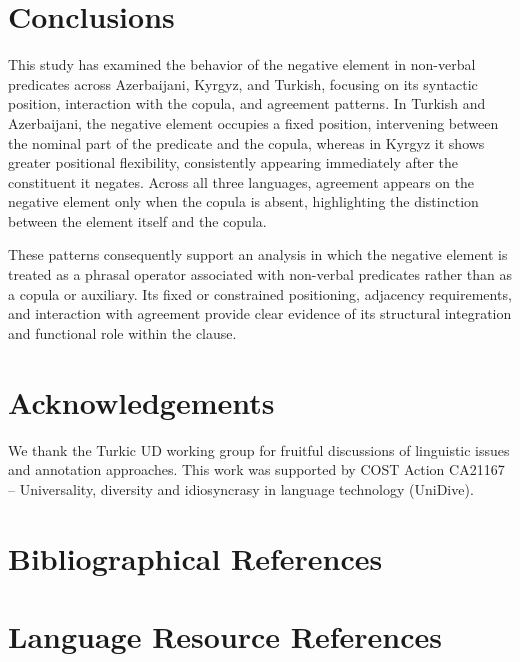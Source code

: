 \documentclass[10pt, a4paper]{article}
\begin{document}
\section{Conclusions}

This study has examined the behavior of the negative element in non-verbal predicates across Azerbaijani, Kyrgyz, and Turkish, focusing on its syntactic position, interaction with the copula, and agreement patterns.
In Turkish and Azerbaijani, the negative element occupies a fixed position, intervening between the nominal part of the predicate and the copula, whereas in Kyrgyz it shows greater positional flexibility, consistently appearing immediately after the constituent it negates.
Across all three languages, agreement appears on the negative element only when the copula is absent, highlighting the distinction between the element itself and the copula.

These patterns consequently support an analysis in which the negative element is treated as a phrasal operator associated with non-verbal predicates rather than as a copula or auxiliary.
Its fixed or constrained positioning, adjacency requirements, and interaction with agreement provide clear evidence of its structural integration and functional role within the clause.

\section*{Acknowledgements}

We thank the Turkic UD working group for fruitful discussions of linguistic issues and annotation approaches.
This work was supported by COST Action CA21167 -- Universality, diversity and idiosyncrasy in language technology (UniDive).

\section*{Bibliographical References}




\section*{Language Resource References}
\label{lr:ref}
\end{document}
